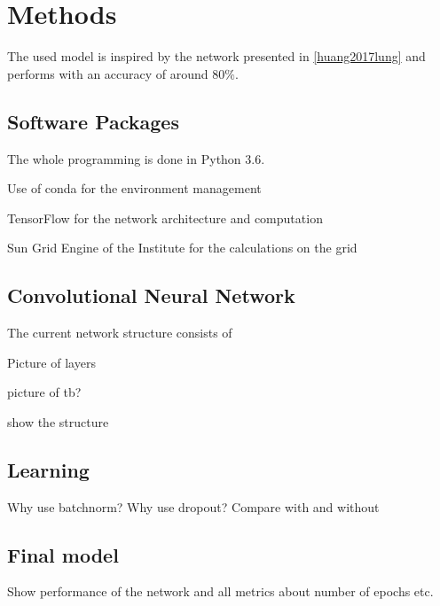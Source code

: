 \documentclass[main.tex]{subfiles}
\begin{document}
\chapter{Methods}
The used model is inspired by the network presented in \ref{huang2017lung} and performs with an accuracy of around 80$\%$. 


\section{Software Packages}
The whole programming is done in Python 3.6. 

Use of conda for the environment management 

TensorFlow for the network architecture and computation

Sun Grid Engine of the Institute for the calculations on the grid

\section{Convolutional Neural Network}
The current network structure consists of

Picture of layers

picture of tb?

show the structure


\section{Learning}
Why use batchnorm?
Why use dropout?
Compare with and without

\section{Final model}
Show performance of the network and all metrics about number of epochs etc.
\end{document}
